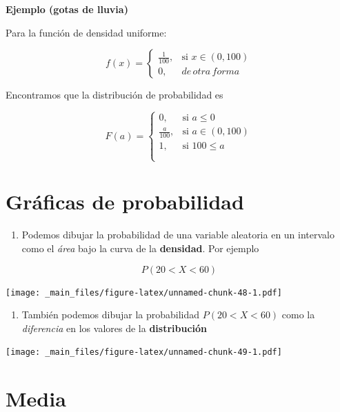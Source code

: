 \documentclass[
]{book}
\providecommand{\tightlist}{%
  \setlength{\itemsep}{0pt}\setlength{\parskip}{0pt}}
\begin{document}
\textbf{Ejemplo (gotas de lluvia)}

Para la función de densidad uniforme:

\[
    f(x)= 
\begin{cases}
    \frac{1}{100},& \text{si } x\in (0,100)\\
    0,& de\, otra\, forma 
\end{cases}
\]

Encontramos que la distribución de probabilidad es

\[
    F(a)= 
\begin{cases}
    0,& \text{si } a \leq 0 \\
    \frac{a}{100},& \text{si } a\in (0,100)\\
    1, & \text{si } 100 \leq a \\
    \\
\end{cases}
\]

\newpage

\hypertarget{gruxe1ficas-de-probabilidad}{%
\section{Gráficas de probabilidad}\label{gruxe1ficas-de-probabilidad}}

\begin{enumerate}
\def\labelenumi{\arabic{enumi})}
\tightlist
\item
  Podemos dibujar la probabilidad de una variable aleatoria en un intervalo como el \emph{área} bajo la curva de la \textbf{densidad}. Por ejemplo
\end{enumerate}

\[P(20<X< 60)\]

\texttt{[image: \_main\_files/figure-latex/unnamed-chunk-48-1.pdf]}

\begin{enumerate}
\def\labelenumi{\arabic{enumi})}
\setcounter{enumi}{1}
\tightlist
\item
  También podemos dibujar la probabilidad \(P(20<X< 60)\) como la \emph{diferencia} en los valores de la \textbf{distribución}
\end{enumerate}

\texttt{[image: \_main\_files/figure-latex/unnamed-chunk-49-1.pdf]}

\hypertarget{media}{%
\section{Media}\label{media}}
\end{document}
